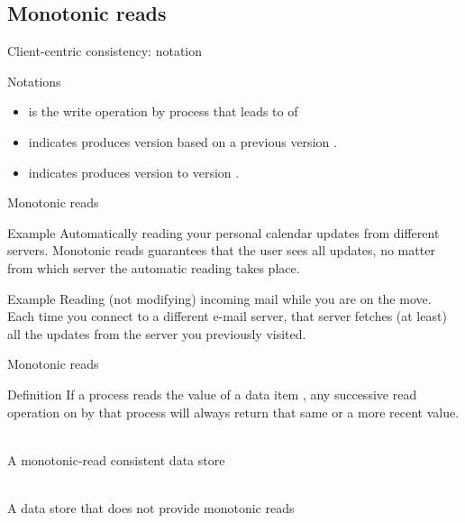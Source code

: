 \subsection{Monotonic reads}
\begin{slide}{Client-centric consistency: notation}
  \begin{block}{Notations} 
    \begin{itemize}
    \item {} is the write operation by process  that leads to   of 
    \item {} indicates  produces version  based on a previous version .
    \item {} indicates  produces version   to version
      .
    \end{itemize}
  \end{block}
\end{slide}
\begin{slide}{Monotonic reads}
  \begin{exampleblock}{Example}
    Automatically reading your personal calendar updates from different servers. Monotonic reads guarantees
    that the user sees all updates, no matter from which server the automatic reading takes place.
  \end{exampleblock}
  \begin{exampleblock}{Example}
    Reading (not modifying) incoming mail while you are on the move. Each time you connect to a different
    e-mail server, that server fetches (at least) all the updates from the server you previously visited.
  \end{exampleblock}
\end{slide}
\begin{slide}{Monotonic reads}
  \begin{block}{Definition}
    If a process reads the value of a data item , any successive read operation
    on  by that process will always return that same or a more recent value.
  \end{block}
  \begin{centerfig}
     \\
    A monotonic-read consistent data store \\
  \end{centerfig}
  \vspace*{12pt}
  \begin{centerfig}
     \\
    A data store that does not provide monotonic reads
  \end{centerfig}
\end{slide}
